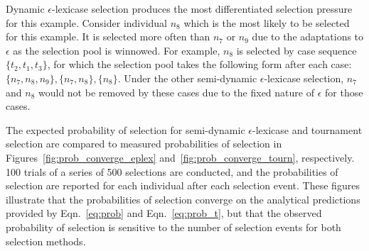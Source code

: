 \documentclass[twoside]{article}
\begin{document}
Dynamic $\epsilon$-lexicase selection produces the most differentiated selection pressure for this example. Consider individual $n_8$ which is the most likely to be selected for this example. It is selected more often than $n_7$ or $n_9$ due to the adaptations to $\epsilon$ as the selection pool is winnowed. For example, $n_8$ is selected by case sequence $\{t_2,t_1,t_3\}$, for which the selection pool takes the following form after each case: $\{n_7, n_8, n_9\}, \{n_7, n_8\}, \{n_8\}$. Under the other semi-dynamic $\epsilon$-lexicase selection, $n_7$ and $n_8$ would not be removed by these cases due to the fixed nature of $\epsilon$ for those cases. 

The expected probability of selection for semi-dynamic $\epsilon$-lexicase and tournament selection are compared to measured probabilities of selection in Figures~\ref{fig:prob_converge_eplex} and~\ref{fig:prob_converge_tourn}, respectively. 100 trials of a series of 500 selections are conducted, and the probabilities of selection are reported for each individual after each selection event. These figures illustrate that the probabilities of selection converge on the analytical predictions provided by Eqn.~\ref{eq:prob} and Eqn.~\ref{eq:prob_t}, but that the observed probability of selection is sensitive to the number of selection events for both selection methods. 

\end{document}
